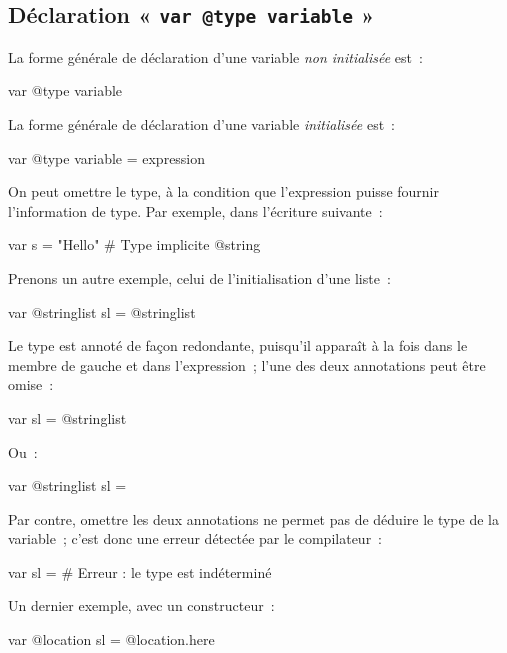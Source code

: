 \subsection{Déclaration « \texttt{var @type variable} »}

La forme générale de déclaration d'une variable \emph{non initialisée} est~:
\begin{galgas4box}
var @type variable
\end{galgas4box}





La forme générale de déclaration d'une variable \emph{initialisée} est~:
\begin{galgas4box}
var @type variable = expression
\end{galgas4box}

On peut omettre le type, à la condition que l'expression puisse fournir l'information de type. Par exemple, dans l'écriture suivante~:
\begin{galgas4}
var s = "Hello" # Type implicite @string
\end{galgas4}


Prenons un autre exemple, celui de l'initialisation d'une liste~:
\begin{galgas4}
var @stringlist sl = @stringlist {}
\end{galgas4}

Le type est annoté de façon redondante, puisqu'il apparaît à la fois dans le membre de gauche et dans l'expression~; l'une des deux annotations peut être omise~:
\begin{galgas4}
var sl = @stringlist {}
\end{galgas4}

Ou~:
\begin{galgas4}
var @stringlist sl = {}
\end{galgas4}

Par contre, omettre les deux annotations ne permet pas de déduire le type de la variable~; c'est donc une erreur détectée par le compilateur~:
\begin{galgas4}
var sl = {} # Erreur : le type est indéterminé
\end{galgas4}

Un dernier exemple, avec un constructeur~:
\begin{galgas4}
var @location sl = @location.here
\end{galgas4}

